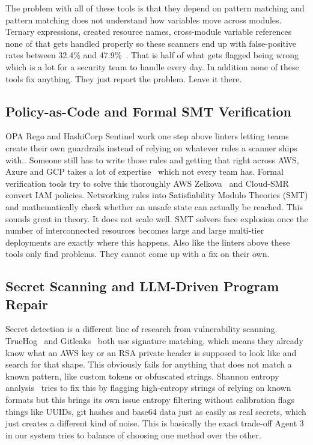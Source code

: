 \documentclass[runningheads]{llncs}
\begin{document}
The problem with all of these tools is that they depend on pattern matching and pattern matching does not understand how variables move across modules. Ternary expressions, created resource names, cross-module variable references none of that gets handled properly so these scanners end up with false-positive rates between 32.4\% and 47.9\%~\cite{kumara2022evaluating}. That is half of what gets flagged being wrong which is a lot for a security team to handle every day. In addition none of these tools fix anything. They just report the problem. Leave it there.

\subsection{Policy-as-Code and Formal SMT Verification}
OPA Rego and HashiCorp Sentinel work one step above linters letting teams create their own guardrails instead of relying on whatever rules a scanner ships with.. Someone still has to write those rules and getting that right across AWS, Azure and GCP takes a lot of expertise~\cite{kumara2022evaluating} which not every team has. Formal verification tools try to solve this thoroughly AWS Zelkova~\cite{backes2018smt} and Cloud-SMR~\cite{song2023cloud} convert IAM policies. Networking rules into Satisfiability Modulo Theories (SMT) and mathematically check whether an unsafe state can actually be reached. This sounds great in theory. It does not scale well. SMT solvers face explosion once the number of interconnected resources becomes large and large multi-tier deployments are exactly where this happens. Also like the linters above these tools only find problems. They cannot come up with a fix on their own.

\subsection{Secret Scanning and LLM-Driven Program Repair}
Secret detection is a different line of research from vulnerability scanning. TrueHog~\cite{trufflehog2024} and Gitleaks~\cite{gitleaks2024} both use signature matching, which means they already know what an AWS key or an RSA private header is supposed to look like and search for that shape. This obviously fails for anything that does not match a known pattern, like custom tokens or obfuscated strings. Shannon entropy analysis~\cite{shannon1948mathematical} tries to fix this by flagging high-entropy strings of relying on known formats but this brings its own issue entropy filtering without calibration flags things like UUIDs, git hashes and base64 data just as easily as real secrets, which just creates a different kind of noise. This is basically the exact trade-off Agent 3 in our system tries to balance of choosing one method over the other.
\end{document}
